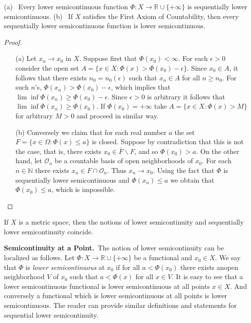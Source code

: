 \begin{proposition}\label{chap1-prop1.2}
{\rm(a)}~ Every lower semicontinuous function $\Phi:X\to
\mathbb{R}\cup \{+\infty\}$ is sequentially lower
semicontinuous. {\rm(b)}~ If $X$ satisfies the First Axiom of
Countability, then every sequentially lower semicontinuous function is
lower semicontinuous.
\end{proposition}

\begin{proof}
\begin{itemize}
\item[(a)] Let $x_{n}\to x_{0}$ in $X$. Suppose first that
  $\Phi(x_{0})<\infty$. For each $\epsilon>0$ consider the open set
  $A=\{x\in X:\Phi(x)>\Phi(x_{0})-\epsilon\}$. Since $x_{0}\in A$, it
  follows that there exists $n_{0}=n_{0}(\epsilon)$ such that
  $x_{n}\in A$ for all $n\geq n_{0}$. For such $n$'s,
  $\Phi(x_{n})>\Phi(x_{0})-\epsilon$, which implies that
  $\lim\inf\Phi(x_{n})\geq \Phi(x_{0})-\epsilon$. Since $\epsilon>0$
  is arbitrary it follows that $\lim\inf\Phi(x_{n})\geq
  \Phi(x_{0})$. If $\Phi(x_{0})=+\infty$ take $A=\{x\in X:\Phi(x)>M\}$
  for arbitrary $M>0$ and proceed in similar way.

\item[(b)] Conversely we claim that for each real number $a$ the set
  $F=\{x\in \Omega:\Phi(x)\leq a\}$ is closed. Suppose by
  contradiction that this is not the case, that is, there exists
  $x_{0}\in \overline{F}\backslash F$, and so $\Phi(x_{0})>a$. On the
  other hand, let $\mathcal{O}_{n}$ be a countable basis of open
  neighborhoods of $x_{0}$. For each $n\in \mathbb{N}$ there exists
  $x_{n}\in F\cap \mathcal{O}_{n}$. Thus $x_{n}\to x_{0}$. Using the
  fact that $\Phi$ is sequentially lower semicontinuous and
  $\Phi(x_{n})\leq a$ we obtain that $\Phi(x_{0})\leq a$, which is
  impossible. 
\end{itemize}
\end{proof}

\begin{corollary}\label{chap1-coro1.3}
If $X$ is a metric space, then the notions of lower semicontinuity and
sequentially lower semicontinuity coincide.
\end{corollary}

\noindent
{\bf Semicontinuity at a Point.}~The notion of lower semicontinuity
can be localized as follows. Let $\Phi:X\to \mathbb{R}\cup\{+\infty\}$
be a functional and $x_{0}\in X$. We say that $\Phi$ is {\em lower
  semicontinuous} at $x_{0}$ if for all $a<\Phi(x_{0})$ there exists
an\pageoriginale open neighborhood $V$ of $x_{0}$ such that
$a<\Phi(x)$ for all $x\in V$. It is easy to see that a lower
semicontinuous functional is lower semicontinuous at all points $x\in
X$. And conversely a functional which is lower semicontinuous at all
points is lower semicontinuous. The reader can provide similar
definitions and statements for sequential lower semicontinuity.

